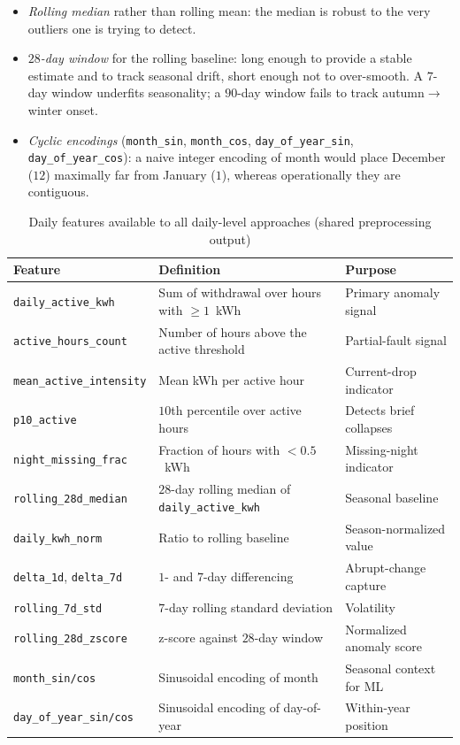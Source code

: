 \documentclass[11pt]{article}
\begin{document}
\begin{itemize}[leftmargin=1.5em,itemsep=1pt]
  \item \emph{Rolling median} rather than rolling mean: the median is robust to the very outliers one is trying to detect.
  \item \emph{$28$-day window} for the rolling baseline: long enough to provide a stable estimate and to track seasonal drift, short enough not to over-smooth. A $7$-day window underfits seasonality; a $90$-day window fails to track autumn$\to$winter onset.
  \item \emph{Cyclic encodings} (\texttt{month\_sin}, \texttt{month\_cos}, \texttt{day\_of\_year\_sin}, \texttt{day\_of\_year\_cos}): a naive integer encoding of month would place December ($12$) maximally far from January ($1$), whereas operationally they are contiguous.
\end{itemize}

\begin{table}[H]
\centering
\caption{Daily features available to all daily-level approaches (shared preprocessing output)}
\label{tab:daily_features}
\small
\begin{tabular}{p{3.3cm}p{5.5cm}p{5.2cm}}
\toprule
\textbf{Feature} & \textbf{Definition} & \textbf{Purpose}\\
\midrule
\texttt{daily\_active\_kwh}      & Sum of withdrawal over hours with $\geq 1$~kWh & Primary anomaly signal\\
\texttt{active\_hours\_count}    & Number of hours above the active threshold & Partial-fault signal\\
\texttt{mean\_active\_intensity} & Mean kWh per active hour & Current-drop indicator\\
\texttt{p10\_active}             & $10$th percentile over active hours & Detects brief collapses\\
\texttt{night\_missing\_frac}    & Fraction of hours with $<0.5$~kWh & Missing-night indicator\\
\texttt{rolling\_28d\_median}    & $28$-day rolling median of \texttt{daily\_active\_kwh} & Seasonal baseline\\
\texttt{daily\_kwh\_norm}        & Ratio to rolling baseline & Season-normalized value\\
\texttt{delta\_1d}, \texttt{delta\_7d} & $1$- and $7$-day differencing & Abrupt-change capture\\
\texttt{rolling\_7d\_std}        & $7$-day rolling standard deviation & Volatility\\
\texttt{rolling\_28d\_zscore}    & z-score against $28$-day window & Normalized anomaly score\\
\texttt{month\_sin/cos}          & Sinusoidal encoding of month & Seasonal context for ML\\
\texttt{day\_of\_year\_sin/cos}  & Sinusoidal encoding of day-of-year & Within-year position\\
\bottomrule
\end{tabular}
\end{table}
\end{document}
